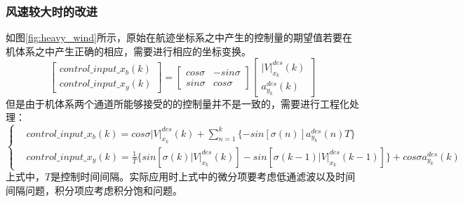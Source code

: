 \subsubsection*{风速较大时的改进}
如图\ref{fig:heavy_wind}所示，原始在航迹坐标系之中产生的控制量的期望值若要在机体系之中产生正确的相应，需要进行相应的坐标变换。
\begin{equation}
    \left[
    \begin{matrix}
        control\_input\_x_b(k)\\
        control\_input\_x_y(k)
    \end{matrix}
    \right]
    =
    \left[
    \begin{matrix}
        cos\sigma& -sin\sigma\\
        sin\sigma& cos\sigma
    \end{matrix}
    \right]
    \left[
        \begin{matrix}
            |V|_{x_k}^{des}(k)\\
            a_{y_k}^{des}(k)
        \end{matrix}
        \right]
\end{equation}
但是由于机体系两个通道所能够接受的的控制量并不是一致的，需要进行工程化处理：
\begin{equation}
    \left\{
        \begin{aligned}
            &control\_input\_x_b(k)=cos\sigma|V|_{x_k}^{des}(k)+\sum_{n=1}^k\{-sin[\sigma(n)]a_{y_k}^{des}(n)T\}\\
            &control\_input\_x_y(k)=\frac{1}{T}\{sin[\sigma(k)|V|_{x_k}^{des}(k)]-sin[\sigma(k-1)|V|_{x_k}^{des}(k-1)]\}+cos\sigma a_{y_k}^{des}(k)
        \end{aligned}
    \right .
\end{equation}
上式中，$T$是控制时间间隔。实际应用时上式中的微分项要考虑低通滤波以及时间间隔问题，积分项应考虑积分饱和问题。
